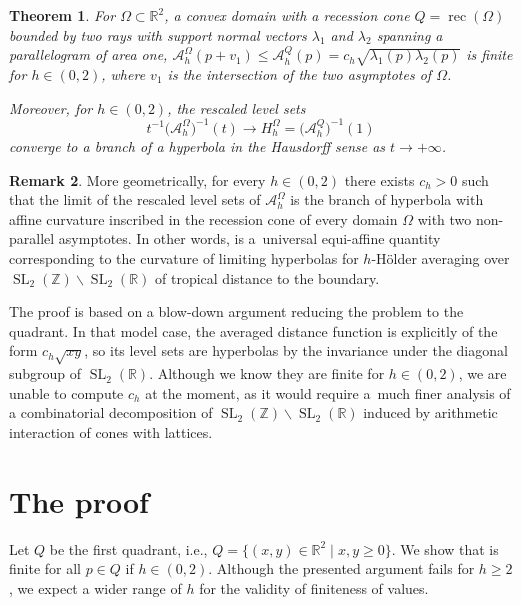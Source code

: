\documentclass[10pt,a4paper]{amsart}
\numberwithin{equation}{section}
\newtheorem{Theorem}{Theorem}[section]
\theoremstyle{definition}
\newtheorem{Remark}[Theorem]{Remark}
\begin{document}
\begin{Theorem}
For $\Omega\subset\mathbb{R}^2$, a convex domain with a recession cone $Q=\operatorname{rec}(\Omega)$ bounded by two rays with support normal vectors $\lambda_1$ and $\lambda_2$ spanning a parallelogram of area one, $\mathcal{A}^\Omega_h(p+v_1)\leq \mathcal{A}^Q_h(p)=c_h\sqrt{\lambda_1(p)\lambda_2(p)}$ is finite for $h\in(0,2)$, where $v_1$ is the intersection of the two asymptotes of $\Omega$.

Moreover, for $h\in(0,2)$, the rescaled level sets
\[
t^{-1}\bigl(\mathcal A_h^\Omega\bigr)^{-1}(t)\longrightarrow H^\Omega_h=\bigl(\mathcal{A}^Q_h\bigr)^{-1}(1)
\]
converge to a branch of a hyperbola in the Hausdorff sense as $t\to+\infty$.
\end{Theorem}


\begin{Remark}
More geometrically, for every $h\in(0,2)$ there exists $c_h>0$ such that the limit of the rescaled level sets of $\mathcal{A}^\Omega_h$ is the branch of hyperbola with affine curvature  inscribed in the recession cone of every domain $\Omega$ with two non-parallel asymptotes. In other words,  is a~universal equi-affine quantity corresponding to the curvature of limiting hyperbolas for $h$-H\"older averaging over $\operatorname{SL}_2(\mathbb{Z})\backslash\operatorname{SL}_2(\mathbb{R})$ of tropical distance to the boundary.
\end{Remark}

The proof is based on a blow-down argument reducing the problem to the quadrant. In that model case, the averaged distance function is explicitly of the form $c_h\sqrt{xy}$, so its level sets are hyperbolas by the invariance under the diagonal subgroup of $\operatorname{SL}_2(\mathbb{R})$. Although we know they are finite for $h\in(0,2)$, we are unable to compute $c_h$ at the moment, as it would require a~much finer analysis of a combinatorial decomposition of $\operatorname{SL}_2(\mathbb{Z})\backslash\operatorname{SL}_2(\mathbb{R})$ induced by arithmetic interaction of cones with lattices.


\section{The proof}
Let $Q$ be the first quadrant, i.e., $Q=\bigl\{(x,y)\in\mathbb{R}^2 \mid x,y\geq 0\bigr\}$.
We show that  is finite for all $p\in Q$ if $h\in(0,2)$. Although the presented argument fails for $h\geq 2$, we expect a wider range of $h$ for the validity of finiteness of values.
\end{document}
